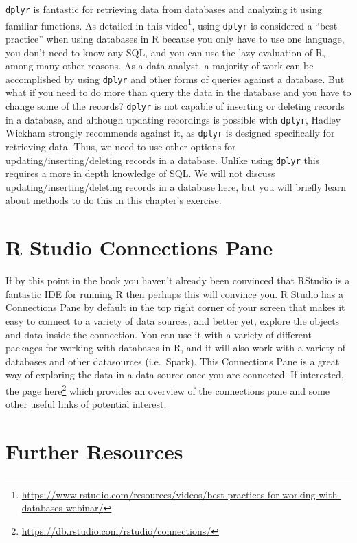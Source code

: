 \documentclass[]{krantz}
\renewcommand{\href}[2]{#2\footnote{\url{#1}}}
\begin{document}
\texttt{dplyr} is fantastic for retrieving data from databases and
analyzing it using familiar functions. As detailed in this
\href{https://www.rstudio.com/resources/videos/best-practices-for-working-with-databases-webinar/}{video},
using \texttt{dplyr} is considered a ``best practice'' when using
databases in R because you only have to use one language, you don't need
to know any SQL, and you can use the lazy evaluation of R, among many
other reasons. As a data analyst, a majority of work can be accomplished
by using \texttt{dplyr} and other forms of queries against a database.
But what if you need to do more than query the data in the database and
you have to change some of the records? \texttt{dplyr} is not capable of
inserting or deleting records in a database, and although updating
recordings is possible with \texttt{dplyr}, Hadley Wickham strongly
recommends against it, as \texttt{dplyr} is designed specifically for
retrieving data. Thus, we need to use other options for
updating/inserting/deleting records in a database. Unlike using
\texttt{dplyr} this requires a more in depth knowledge of SQL. We will
not discuss updating/inserting/deleting records in a database here, but
you will briefly learn about methods to do this in this chapter's
exercise.

\section{R Studio Connections Pane}\label{r-studio-connections-pane}

If by this point in the book you haven't already been convinced that
RStudio is a fantastic IDE for running R then perhaps this will convince
you. R Studio has a Connections Pane by default in the top right corner
of your screen that makes it easy to connect to a variety of data
sources, and better yet, explore the objects and data inside the
connection. You can use it with a variety of different packages for
working with databases in R, and it will also work with a variety of
databases and other datasources (i.e.~Spark). This Connections Pane is a
great way of exploring the data in a data source once you are connected.
If interested, the page
\href{https://db.rstudio.com/rstudio/connections/}{here} which provides
an overview of the connections pane and some other useful links of
potential interest.

\section{Further Resources}\label{further-resources}
\end{document}
